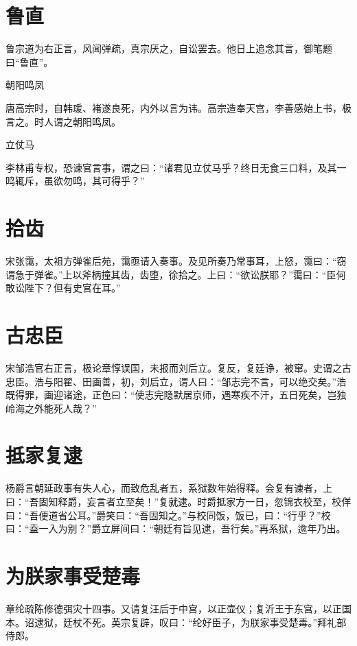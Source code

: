 \documentclass[a4paper,12pt,UTF8,twoside]{ctexbook}
\begin{document}
    \section{鲁直}
    
    鲁宗道为右正言，风闻弹疏，真宗厌之，自讼罢去。他日上追念其言，御笔题曰“鲁直”。
    
    朝阳鸣凤
    
    唐高宗时，自韩瑗、褚遂良死，内外以言为讳。高宗造奉天宫，李善感始上书，极言之。时人谓之朝阳鸣凤。
    
    立仗马
    
    李林甫专权，恐谏官言事，谓之曰：“诸君见立仗马乎？终日无食三口料，及其一鸣辄斥，虽欲勿鸣，其可得乎？”
    
    \section{拾齿}
    
    宋张霭，太祖方弹雀后苑，霭亟请入奏事。及见所奏乃常事耳，上怒，霭曰：“窃谓急于弹雀。”上以斧柄撞其齿，齿堕，徐拾之。上曰：“欲讼朕耶？”霭曰：“臣何敢讼陛下？但有史官在耳。”
    
    \section{古忠臣}
    
    宋邹浩官右正言，极论章惇误国，未报而刘后立。复反，复廷诤，被窜。史谓之古忠臣。浩与阳翟、田画善，初，刘后立，谓人曰：“邹志完不言，可以绝交矣。”浩既得罪，画迎诸途，正色曰：“使志完隐默居京师，遇寒疾不汗，五日死矣，岂独岭海之外能死人哉？”
    
    \section{抵家复逮}
    
    杨爵言朝延政事有失人心，而致危乱者五，系狱数年始得释。会复有谏者，上曰：“吾固知释爵，妄言者立至矣！”复就逮。时爵抵家方一日，忽锦衣校至，校佯曰：“吾便道省公耳。”爵笑曰：“吾固知之。”与校同饭，饭已，曰：“行乎？”校曰：“盍一入为别？”爵立屏间曰：“朝廷有旨见逮，吾行矣。”再系狱，逾年乃出。
    
    \section{为朕家事受楚毒}
    
    章纶疏陈修德弭灾十四事。又请复汪后于中宫，以正壶仪；复沂王于东宫，以正国本。诏逮狱，廷杖不死。英宗复辟，叹曰：“纶好臣子，为朕家事受楚毒。”拜礼部侍郎。
    
\end{document}
